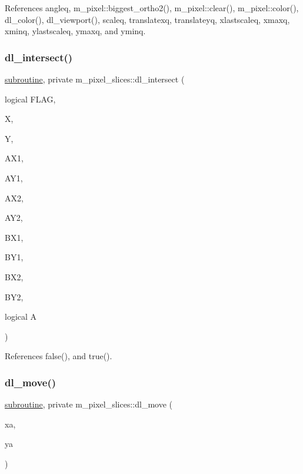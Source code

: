 References angleq, m\+\_\+pixel\+::biggest\+\_\+ortho2(), m\+\_\+pixel\+::clear(), m\+\_\+pixel\+::color(), dl\+\_\+color(), dl\+\_\+viewport(), scaleq, translatexq, translateyq, xlastscaleq, xmaxq, xminq, ylastscaleq, ymaxq, and yminq.

\mbox{\label{namespacem__pixel__slices_a1508683ec3b2444091bb34d40b5d8b93}} 
\subsubsection{\texorpdfstring{dl\+\_\+intersect()}{dl\_intersect()}}
{\footnotesize\ttfamily \hyperlink{M__stopwatch_83_8txt_acfbcff50169d691ff02d4a123ed70482}{subroutine}, private m\+\_\+pixel\+\_\+slices\+::dl\+\_\+intersect (\begin{DoxyParamCaption}\item[{logical}]{F\+L\+AG,  }\item[{}]{X,  }\item[{}]{Y,  }\item[{}]{A\+X1,  }\item[{}]{A\+Y1,  }\item[{}]{A\+X2,  }\item[{}]{A\+Y2,  }\item[{}]{B\+X1,  }\item[{}]{B\+Y1,  }\item[{}]{B\+X2,  }\item[{}]{B\+Y2,  }\item[{logical}]{A }\end{DoxyParamCaption})\hspace{0.3cm}{\ttfamily [private]}}



References false(), and true().

\mbox{\label{namespacem__pixel__slices_ab9e9530d7fb4fbea1bc5d52744498731}} 
\subsubsection{\texorpdfstring{dl\+\_\+move()}{dl\_move()}}
{\footnotesize\ttfamily \hyperlink{M__stopwatch_83_8txt_acfbcff50169d691ff02d4a123ed70482}{subroutine}, private m\+\_\+pixel\+\_\+slices\+::dl\+\_\+move (\begin{DoxyParamCaption}\item[{}]{xa,  }\item[{}]{ya }\end{DoxyParamCaption})\hspace{0.3cm}{\ttfamily [private]}}



